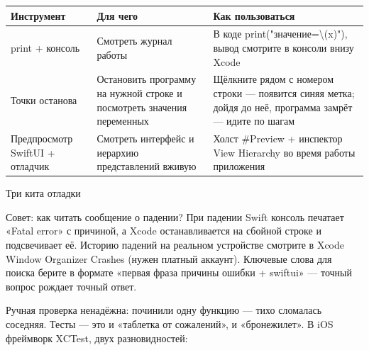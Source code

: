 


\begin{center}
\begin{tabularx}{\linewidth}{|X|X|X|}
\hline
\textbf{Инструмент} & \textbf{Для чего} & \textbf{Как пользоваться} \tabularnewline
\hline
print + консоль & Смотреть журнал работы & В коде print("значение=\textbackslash{}(x)"), вывод смотрите в консоли внизу Xcode \tabularnewline
Точки останова & Остановить программу на нужной строке и посмотреть значения переменных & Щёлкните рядом с номером строки — появится синяя метка; дойдя до неё, программа замрёт — идите по шагам \tabularnewline
Предпросмотр SwiftUI + отладчик & Смотреть интерфейс и иерархию представлений вживую & Холст \#Preview + инспектор View Hierarchy во время работы приложения \tabularnewline
\hline
\end{tabularx}
\end{center}

\begin{center}\small\color{gray}Три кита отладки\end{center}

\begin{tcbinfo}{Совет: как читать сообщение о падении?}
При падении Swift консоль печатает «Fatal error» с причиной, а Xcode останавливается на сбойной строке и подсвечивает её. Историю падений на реальном устройстве смотрите в Xcode Window Organizer Crashes (нужен платный аккаунт). Ключевые слова для поиска берите в формате «первая фраза причины ошибки + swiftui» — точный вопрос рождает точный ответ.

\end{tcbinfo}


Ручная проверка ненадёжна: починили одну функцию — тихо сломалась соседняя. Тесты — это и «таблетка от сожалений», и «бронежилет». В iOS фреймворк XCTest, двух разновидностей:

